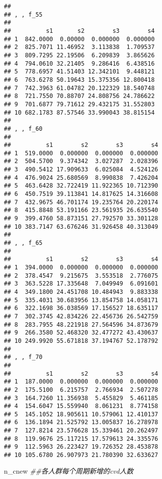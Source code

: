 \documentclass[
]{article}
\newenvironment{Shaded}{\begin{snugshade}}{\end{snugshade}}
\newcommand{\CommentTok}[1]{\textcolor[rgb]{0.56,0.35,0.01}{\textit{#1}}}
\newcommand{\NormalTok}[1]{#1}
\begin{document}
\begin{verbatim}
## 
## , , f_55
## 
##          s1       s2        s3        s4
## 1  842.0000  0.00000  0.000000  0.000000
## 2  825.7071 11.46952  3.113838  1.709537
## 3  809.7295 22.19506  6.209839  3.865626
## 4  794.0610 32.21405  9.286416  6.438516
## 5  778.6957 41.51403 12.342101  9.448121
## 6  763.6278 50.19643 15.375356 12.800418
## 7  742.3963 61.04782 20.122329 18.540748
## 8  721.7550 70.88707 24.808756 24.786622
## 9  701.6877 79.71612 29.432175 31.552803
## 10 682.1783 87.57546 33.990043 38.815154
## 
## , , f_60
## 
##          s1        s2        s3        s4
## 1  519.0000  0.000000  0.000000  0.000000
## 2  504.5700  9.374342  3.027287  2.028396
## 3  490.5412 17.909633  6.025084  4.524126
## 4  476.9024 25.680569  8.990838  7.426204
## 5  463.6428 32.722419 11.922365 10.712390
## 6  450.7519 39.113841 14.817625 14.316608
## 7  432.9675 46.701174 19.235764 20.220174
## 8  415.8848 53.191166 23.561935 26.635540
## 9  399.4760 58.873151 27.792570 33.301128
## 10 383.7147 63.676246 31.926458 40.313049
## 
## , , f_65
## 
##          s1        s2        s3        s4
## 1  394.0000  0.000000  0.000000  0.000000
## 2  378.4547  9.215675  3.553518  2.776075
## 3  363.5228 17.335648  7.049949  6.091601
## 4  349.1800 24.451708 10.484943  9.883338
## 5  335.4031 30.683956 13.854758 14.058171
## 6  322.1698 36.038569 17.156527 18.635117
## 7  302.3745 42.834226 22.456736 26.542759
## 8  283.7955 48.221918 27.564596 34.873679
## 9  266.3580 52.468320 32.477272 43.430637
## 10 249.9920 55.671818 37.194767 52.178792
## 
## , , f_70
## 
##          s1        s2        s3        s4
## 1  187.0000  0.000000  0.000000  0.000000
## 2  175.5100  6.215757  2.766934  2.507278
## 3  164.7260 11.356938  5.455829  5.461185
## 4  154.6047 15.559940  8.061231  8.774158
## 5  145.1052 18.905611 10.579061 12.410137
## 6  136.1894 21.525792 13.005837 16.278978
## 7  127.8214 23.576628 15.339461 20.262497
## 8  119.9676 25.117215 17.579613 24.335576
## 9  112.5963 26.223427 19.726352 28.453878
## 10 105.6780 26.907973 21.780390 32.633627
\end{verbatim}

\begin{Shaded}
\begin{Highlighting}[]
\NormalTok{n_cnew  }\CommentTok{##各人群每个周期新增的cvd人数 }
\end{Highlighting}
\end{Shaded}
\end{document}
